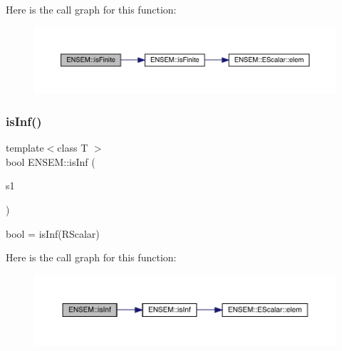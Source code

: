 Here is the call graph for this function\+:\nopagebreak
\begin{figure}[H]
\begin{center}
\leavevmode
\includegraphics[width=350pt]{d9/ded/group__rscalar_ga7ec54fb1eaedacb87a42df35a5f11001_cgraph}
\end{center}
\end{figure}
\mbox{\label{group__rscalar_ga01c23e87027a8c43440f812a0693b62f}} 
\subsubsection{\texorpdfstring{isInf()}{isInf()}}
{\footnotesize\ttfamily template$<$class T $>$ \\
bool E\+N\+S\+E\+M\+::is\+Inf (\begin{DoxyParamCaption}\item[{const \mbox{\hyperlink{classENSEM_1_1RScalar}{R\+Scalar}}$<$ T $>$ \&}]{s1 }\end{DoxyParamCaption})}



bool = is\+Inf(\+R\+Scalar) 

Here is the call graph for this function\+:\nopagebreak
\begin{figure}[H]
\begin{center}
\leavevmode
\includegraphics[width=350pt]{d9/ded/group__rscalar_ga01c23e87027a8c43440f812a0693b62f_cgraph}
\end{center}
\end{figure}
\mbox{\label{group__rscalar_ga831d3981e39b262a19f78641d8b770c3}} 
